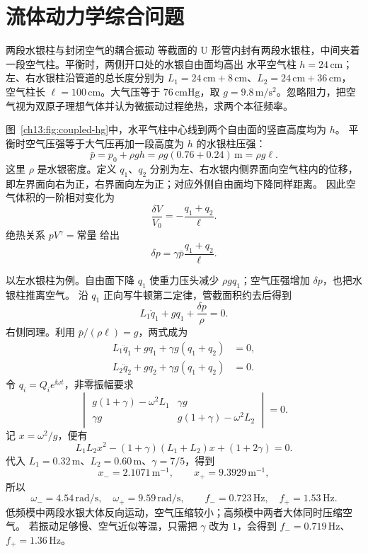 
\section{流体动力学综合问题}\label{ch13:sec:problems}

\begin{origexamplebox}{两段水银柱与封闭空气的耦合振动}\label{ch13:ex:coupled-hg}
等截面的 U 形管内封有两段水银柱，中间夹着一段空气柱。平衡时，两侧开口处的水银自由面均高出
水平空气柱 $h=24\,\mathrm{cm}$；左、右水银柱沿管道的总长度分别为
$L_1=24\,\mathrm{cm}+8\,\mathrm{cm}$、$L_2=24\,\mathrm{cm}+36\,\mathrm{cm}$，
空气柱长 $\ell=100\,\mathrm{cm}$。大气压等于 $76\,\mathrm{cmHg}$，取
$g=9.8\,\mathrm{m/s^2}$。忽略阻力，把空气视为双原子理想气体并认为微振动过程绝热，求两个本征频率。

\FluidCoupledHgDiagram
\end{origexamplebox}
\begin{xesolution}
图~\ref{ch13:fig:coupled-hg}中，水平气柱中心线到两个自由面的竖直高度均为 $h$。
平衡时空气压强等于大气压再加一段高度为 $h$ 的水银柱压强：
\[
 \bar p=p_0+\rho gh=\rho g(0.76+0.24)\,\mathrm m=\rho g\ell .
\]
这里 $\rho$ 是水银密度。定义 $q_1$、$q_2$ 分别为左、右水银内侧界面向空气柱内的位移，
即左界面向右为正，右界面向左为正；对应外侧自由面均下降同样距离。
因此空气体积的一阶相对变化为
\[
 \frac{\delta V}{V_0}=-\frac{q_1+q_2}{\ell}.
\]
绝热关系 $pV^\gamma=\text{常量}$ 给出
\[
 \delta p=\gamma\bar p\frac{q_1+q_2}{\ell}.
\]

以左水银柱为例。自由面下降 $q_1$ 使重力压头减少 $\rho gq_1$；空气压强增加 $\delta p$，也把水银柱推离空气。
沿 $q_1$ 正向写牛顿第二定律，管截面积约去后得到
\[
 L_1\ddot q_1+gq_1+\frac{\delta p}{\rho}=0.
\]
右侧同理。利用 $\bar p/(\rho\ell)=g$，两式成为
\begin{align*}
 L_1\ddot q_1+gq_1+\gamma g(q_1+q_2)&=0,\\
 L_2\ddot q_2+gq_2+\gamma g(q_1+q_2)&=0.
\end{align*}
令 $q_i=Q_i e^{\ii\omega t}$，非零振幅要求
\[
 \begin{vmatrix}
 g(1+\gamma)-\omega^2L_1&\gamma g\\
 \gamma g&g(1+\gamma)-\omega^2L_2
 \end{vmatrix}=0.
\]
记 $x=\omega^2/g$，便有
\[
 L_1L_2x^2-(1+\gamma)(L_1+L_2)x+(1+2\gamma)=0.
\]
代入 $L_1=0.32\,\mathrm m$、$L_2=0.60\,\mathrm m$、$\gamma=7/5$，得到
\[
 x_-=2.1071\,\mathrm{m^{-1}},\qquad x_+=9.3929\,\mathrm{m^{-1}},
\]
所以
\[
 \boxed{\omega_-=4.54\,\mathrm{rad/s},\quad \omega_+=9.59\,\mathrm{rad/s}},
 \qquad
 \boxed{f_-=0.723\,\mathrm{Hz},\quad f_+=1.53\,\mathrm{Hz}}.
\]
低频模中两段水银大体反向运动，空气压缩较小；高频模中两者大体同时压缩空气。
若振动足够慢、空气近似等温，只需把 $\gamma$ 改为 $1$，会得到
$f_-=0.719\,\mathrm{Hz}$、$f_+=1.36\,\mathrm{Hz}$。
\end{xesolution}

